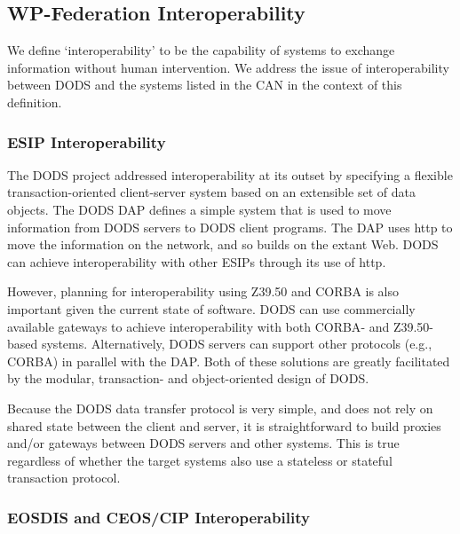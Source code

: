 \documentclass[12pt]{article}
\begin{document}
\subsection{WP-Federation Interoperability}
\label{wp-federation-interoperability}

We define `interoperability' to be the capability of systems to
exchange information without human intervention. We address the 
issue of interoperability between \ac{DODS} and the systems listed 
in the CAN in the context of this definition.

\subsubsection{ESIP Interoperability}\label{esip-interoperability}

The \ac{DODS} project addressed interoperability at its outset by
specifying a flexible transaction-oriented client-server system based
on an extensible set of data objects. The \ac{DODS} \ac{DAP} defines a
simple system that is used to move information from \ac{DODS} servers
to \ac{DODS} client programs. The \ac{DAP} uses \ac{http} to move the
information on the network, and so builds on the extant Web. \ac{DODS}
can achieve interoperability with other \acs{ESIP}s through its use of
\ac{http}.

However, planning for interoperability using Z39.50 and \ac{CORBA} 
is also important given the current state of software. \ac{DODS} can 
use commercially available gateways to achieve interoperability with 
both \ac{CORBA}- and Z39.50-based systems.  Alternatively, \ac{DODS} 
servers can support other protocols (e.g., \ac{CORBA}) in parallel 
with the \ac{DAP}. Both of these solutions are greatly facilitated 
by the modular, transaction- and object-oriented design of \ac{DODS}.

Because the \ac{DODS} data transfer protocol is very simple, and does
not rely on shared state between the client and server, it is
straightforward to build proxies and/or gateways between \ac{DODS}
servers and other systems. This is true regardless of whether the
target systems also use a stateless or stateful transaction protocol.

\subsubsection{EOSDIS and CEOS/CIP Interoperability}
\label{eosdis-interoperability}
\end{document}
